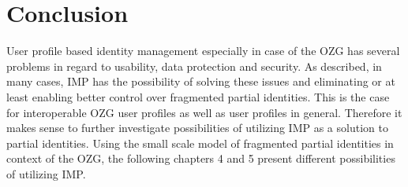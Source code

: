 \section{Conclusion}

User profile based identity management especially in case of the OZG has several problems in regard to usability, data protection and security. As described, in many cases, IMP has the possibility of solving these issues and eliminating or at least enabling better control over fragmented partial identities. This is the case for interoperable OZG user profiles as well as user profiles in general. Therefore it makes sense to further investigate possibilities of utilizing IMP as a solution to partial identities. Using the small scale model of fragmented partial identities in context of the OZG, the following chapters 4 and 5 present different possibilities of utilizing IMP.